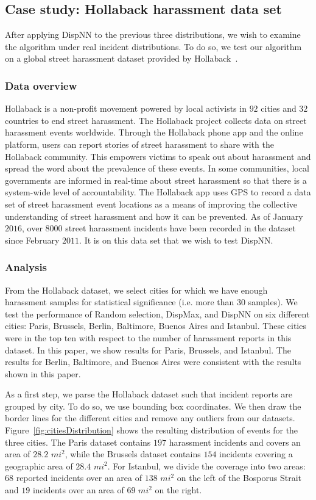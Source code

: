 \documentclass{acm_proc_article-sp}
\begin{document}
\subsection{Case study: Hollaback harassment data set}
After applying DispNN to the previous three distributions, we wish to examine the algorithm under real incident distributions. To do so, we test our algorithm on a global street harassment dataset provided by Hollaback~\cite{hollaback}.
\subsubsection{Data overview}
Hollaback is a non-profit movement powered by local activists in $92$ cities and $32$ countries to end street harassment. The Hollaback project collects data on street harassment events worldwide. Through the Hollaback phone app and the online platform, users can report stories of street harassment to share with the Hollaback community. This empowers victims to speak out about harassment and spread the word about the prevalence of these events. In some communities, local governments are informed in real-time about street harassment so that there is a system-wide level of accountability. The Hollaback app uses GPS to record a data set of street harassment event locations as a means of improving the collective understanding of street harassment and how it can be prevented.  As of January $2016$, over $8000$ street harassment incidents have been recorded in the dataset since February $2011$.  It is on this data set that we wish to test DispNN.\par
\subsubsection{Analysis}
From the Hollaback dataset, we select cities for which we have enough harassment samples for statistical significance (i.e. more than 30 samples). We test the performance of Random selection, DispMax, and DispNN on six different cities: Paris, Brussels, Berlin, Baltimore, Buenos Aires and Istanbul. These cities were in the top ten with respect to the number of harassment reports in this dataset. In this paper, we show results for Paris, Brussels, and Istanbul. The results for Berlin, Baltimore, and Buenos Aires were consistent with the results shown in this paper. \par

As a first step, we parse the Hollaback dataset such that incident reports are grouped by city. To do so, we use bounding box coordinates. We then draw the border lines for the different cities and remove any outliers from our datasets. Figure~\ref{fig:citiesDistribution} shows the resulting distribution of events for the three cities. The Paris dataset contains $197$ harassment incidents and covers an area of $28.2$ $mi^2$, while the Brussels dataset contains $154$ incidents covering a geographic area of $28.4$ $mi^2$. For Istanbul, we divide the coverage into two areas: $68$ reported incidents over an area of $138$ $mi^2$ on the left of the Bosporus Strait and $19$ incidents over an area of $69$ $mi^2$ on the right. \par
\end{document}
